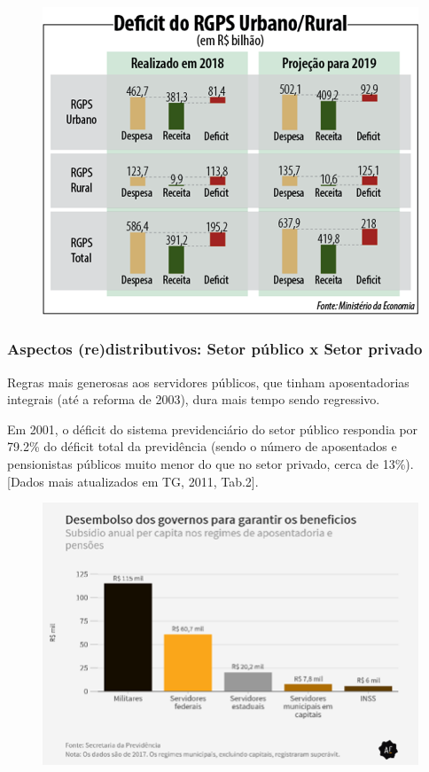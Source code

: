 \documentclass[a4paper,12pt]{article}[abntex2]
\begin{document}
\begin{figure}[H]
    \centering
    \includegraphics[width=0.7\linewidth]{Imagens/a17i1.png}
\end{figure}

\subsubsection{\textbf{Aspectos (re)distributivos: Setor público x Setor privado}}
Regras mais generosas aos servidores públicos, que tinham aposentadorias integrais  (até a reforma de 2003), dura mais tempo sendo regressivo.

Em 2001, o déficit do sistema previdenciário do setor público respondia por 79.2\% do déficit total da previdência (sendo o número de aposentados e pensionistas públicos muito menor do que no setor privado, cerca de 13\%). [Dados mais atualizados em TG, 2011, Tab.2].

\begin{figure}[H]
    \centering
    \includegraphics[width=0.7\linewidth]{Imagens/a17i2.png}
\end{figure}
\end{document}
